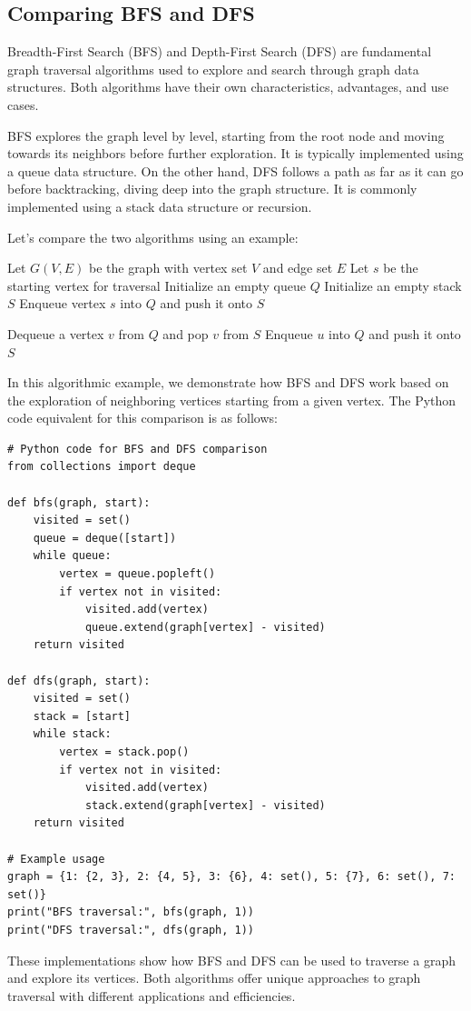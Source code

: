 \documentclass[12pt]{book} %
\begin{document}
\subsection{Comparing BFS and DFS}

Breadth-First Search (BFS) and Depth-First Search (DFS) are fundamental graph traversal algorithms used to explore and search through graph data structures. Both algorithms have their own characteristics, advantages, and use cases.

BFS explores the graph level by level, starting from the root node and moving towards its neighbors before further exploration. It is typically implemented using a queue data structure. On the other hand, DFS follows a path as far as it can go before backtracking, diving deep into the graph structure. It is commonly implemented using a stack data structure or recursion.

Let's compare the two algorithms using an example:
\FloatBarrier
\begin{algorithm}
\caption{Comparison of BFS and DFS}
\begin{algorithmic}[1]
\State Let $G(V, E)$ be the graph with vertex set $V$ and edge set $E$
\State Let $s$ be the starting vertex for traversal
\State Initialize an empty queue $Q$
\State Initialize an empty stack $S$
\State Enqueue vertex $s$ into $Q$ and push it onto $S$

    \State Dequeue a vertex $v$ from $Q$ and pop $v$ from $S$
            \State Enqueue $u$ into $Q$ and push it onto $S$
        \EndIf
    \EndFor
\EndWhile
\end{algorithmic}
\end{algorithm}
\FloatBarrier
In this algorithmic example, we demonstrate how BFS and DFS work based on the exploration of neighboring vertices starting from a given vertex. The Python code equivalent for this comparison is as follows:
\FloatBarrier
\begin{lstlisting}
# Python code for BFS and DFS comparison
from collections import deque

def bfs(graph, start):
    visited = set()
    queue = deque([start])
    while queue:
        vertex = queue.popleft()
        if vertex not in visited:
            visited.add(vertex)
            queue.extend(graph[vertex] - visited)
    return visited

def dfs(graph, start):
    visited = set()
    stack = [start]
    while stack:
        vertex = stack.pop()
        if vertex not in visited:
            visited.add(vertex)
            stack.extend(graph[vertex] - visited)
    return visited

# Example usage
graph = {1: {2, 3}, 2: {4, 5}, 3: {6}, 4: set(), 5: {7}, 6: set(), 7: set()}
print("BFS traversal:", bfs(graph, 1))
print("DFS traversal:", dfs(graph, 1))
\end{lstlisting}
\FloatBarrier
These implementations show how BFS and DFS can be used to traverse a graph and explore its vertices. Both algorithms offer unique approaches to graph traversal with different applications and efficiencies.
\end{document}
